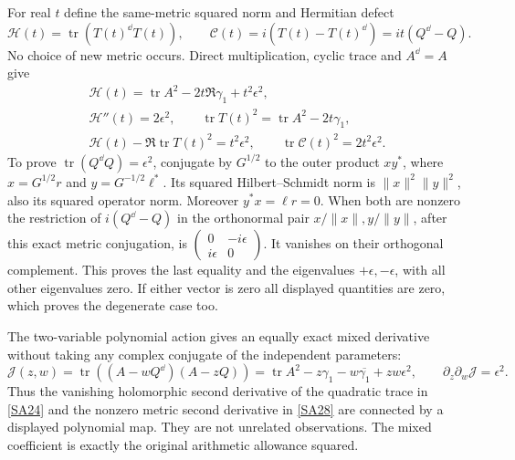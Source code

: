\documentclass[11pt]{article}
\newcommand{\tr}{\operatorname{tr}}\newcommand{\Res}{\operatorname{Res}}
\begin{document}
For real $t$ define the same-metric squared norm and
Hermitian defect
\begin{equation}\tag{SA27}\label{SA27}
\mathcal H(t)=\tr(T(t)^{\dd}T(t)),\qquad
\mathcal C(t)=i(T(t)-T(t)^{\dd})
=it(Q^{\dd}-Q).
\end{equation}
No choice of new metric occurs. Direct multiplication,
cyclic trace and $A^{\dd}=A$ give
\begin{equation}\tag{SA28}\label{SA28}
\begin{gathered}
\mathcal H(t)=\tr A^2-2t\Re\gamma_1+t^2\epsilon^2,\\
\mathcal H''(t)=2\epsilon^2,\qquad
\tr T(t)^2=\tr A^2-2t\gamma_1,\\
\mathcal H(t)-\Re\tr T(t)^2=t^2\epsilon^2,\qquad
\tr\mathcal C(t)^2=2t^2\epsilon^2.
\end{gathered}
\end{equation}
To prove $\tr(Q^{\dd}Q)=\epsilon^2$, conjugate by
$G^{1/2}$ to the outer product
$xy^*$, where $x=G^{1/2}r$ and
$y=G^{-1/2}\ell^*$. Its squared Hilbert--Schmidt norm is
$\|x\|^2\|y\|^2$, also its squared operator norm.
Moreover $y^*x=\ell r=0$.
When both are nonzero the restriction of
$i(Q^{\dd}-Q)$ in the orthonormal pair
$x/\|x\|,y/\|y\|$, after this exact metric conjugation,
is
$\left(\begin{smallmatrix}0&-i\epsilon\\
i\epsilon&0\end{smallmatrix}\right)$.
It vanishes on their orthogonal complement. This proves
the last equality and the eigenvalues
$+\epsilon,-\epsilon$, with all other eigenvalues zero.
If either vector is zero all displayed quantities are
zero, which proves the degenerate case too.

The two-variable polynomial action gives an equally exact
mixed derivative without taking any complex conjugate of
the independent parameters:
\begin{equation}\tag{SA29}\label{SA29}
\mathcal J(z,w)=\tr((A-wQ^{\dd})(A-zQ))
=\tr A^2-z\gamma_1-w\overline{\gamma_1}+zw\epsilon^2,
\qquad \partial_z\partial_w\mathcal J=\epsilon^2 .
\end{equation}
Thus the vanishing holomorphic second derivative of the
quadratic trace in \eqref{SA24} and the nonzero metric
second derivative in \eqref{SA28} are connected by a
displayed polynomial map. They are not unrelated
observations. The mixed coefficient is exactly the
original arithmetic allowance squared.
\end{document}
